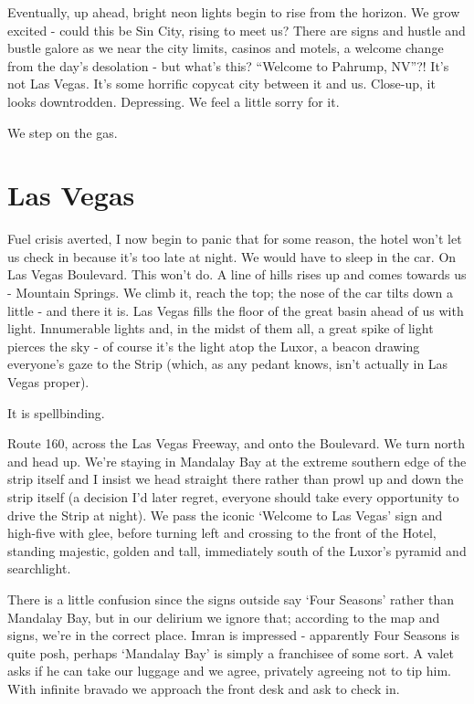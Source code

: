 \documentclass[a5paper,titlepage,11pt]{book}
\begin{document}
Eventually, up ahead, bright neon lights begin to rise from the horizon.  We grow excited - could this be Sin City, rising to meet us?  There are signs and hustle and bustle galore as we near the city limits, casinos and motels, a welcome change from the day's desolation - but what's this?  ``Welcome to Pahrump, NV''?!  It's not Las Vegas.  It's some horrific copycat city between it and us.  Close-up, it looks downtrodden.  Depressing.  We feel a little sorry for it.

We step on the gas.

\section*{Las Vegas}
Fuel crisis averted, I now begin to panic that for some reason, the hotel won't let us check in because it's too late at night.  We would have to sleep in the car.  On Las Vegas Boulevard.  This won't do.  A line of hills rises up and comes towards us - Mountain Springs.  We climb it, reach the top; the nose of the car tilts down a little - and there it is.  Las Vegas fills the floor of the great basin ahead of us with light.  Innumerable lights and, in the midst of them all, a great spike of light pierces the sky - of course it's the light atop the Luxor, a beacon drawing everyone's gaze to the Strip (which, as any pedant knows, isn't actually in Las Vegas proper).

It is spellbinding.

Route 160, across the Las Vegas Freeway, and onto the Boulevard.  We turn north and head up.  We're staying in Mandalay Bay at the extreme southern edge of the strip itself and I insist we head straight there rather than prowl up and down the strip itself (a decision I'd later regret, everyone should take every opportunity to drive the Strip at night).  We pass the iconic `Welcome to Las Vegas' sign and high-five with glee, before turning left and crossing to the front of the Hotel, standing majestic, golden and tall, immediately south of the Luxor's pyramid and searchlight.

There is a little confusion since the signs outside say `Four Seasons' rather than Mandalay Bay, but in our delirium we ignore that; according to the map and signs, we're in the correct place.  Imran is impressed - apparently Four Seasons is quite posh, perhaps `Mandalay Bay' is simply a franchisee of some sort.  A valet asks if he can take our luggage and we agree, privately agreeing not to tip him.  With infinite bravado we approach the front desk and ask to check in.
\end{document}
